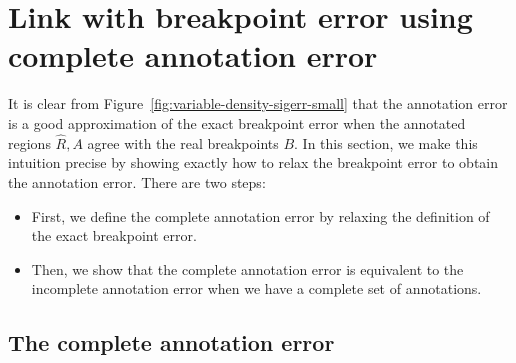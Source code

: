 \documentclass{article}
\begin{document}
\section{Link with breakpoint error using 
complete annotation error}
\label{sec:complete}
It is clear from Figure~\ref{fig:variable-density-sigerr-small} that
the annotation error is a good approximation of the exact breakpoint
error when the annotated regions $\hat R,A$ agree with the real
breakpoints $B$. In this section, we make this intuition precise by
showing exactly how to relax the breakpoint error to obtain the
annotation error. There are two steps:
\begin{itemize}
\item First, we define the complete annotation error by relaxing the
  definition of the exact breakpoint error.
\item Then, we show that the complete annotation error is equivalent
  to the incomplete annotation error when we have a complete set of
  annotations.
\end{itemize}

\subsection{The complete annotation error}
\end{document}
